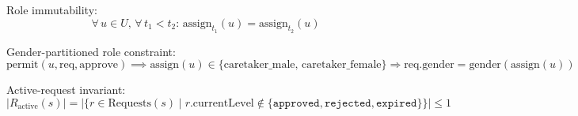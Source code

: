 \documentclass[12pt,a4paper]{report}
\begin{document}
Role immutability:
\begin{equation}
  \forall\, u \in U,\, \forall\, t_1 < t_2:\, \text{assign}_{t_1}(u) = \text{assign}_{t_2}(u)
\end{equation}

Gender-partitioned role constraint:
\begin{equation}
  \text{permit}(u, \text{req}, \text{approve}) \implies \text{assign}(u) \in \{\text{caretaker\_male, caretaker\_female}\} \Rightarrow \text{req.gender} = \text{gender}(\text{assign}(u))
\end{equation}

Active-request invariant:
\begin{equation}
  |R_{\text{active}}(s)| = |\{ r \in \text{Requests}(s) \mid r.\text{currentLevel} \notin \{\texttt{approved}, \texttt{rejected}, \texttt{expired}\}\}| \leq 1
\end{equation}
\end{document}
